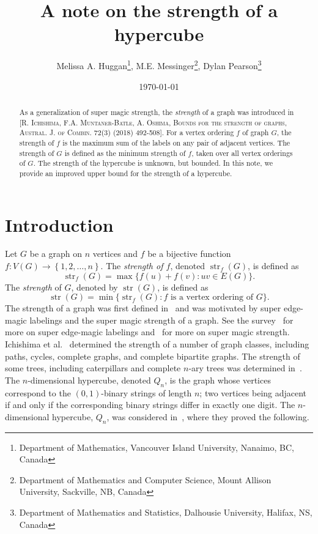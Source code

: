 \documentclass[12pt]{article}
\title{A note on the strength of a hypercube}
\author{Melissa A. Huggan\thanks{Department of Mathematics, Vancouver Island University, Nanaimo, BC, Canada}, M.E. Messinger\thanks{Department of Mathematics and Computer Science, Mount Allison University, Sackville, NB, Canada}, Dylan Pearson\thanks{Department of Mathematics and Statistics, Dalhousie University, Halifax, NS, Canada}}
\date{\today}
\DeclareMathOperator{\str}{str}
\begin{document}
\maketitle

\begin{abstract}  As a generalization of super magic strength, the \emph{strength} of a graph was introduced in [\textsc{R. Ichishima, F.A. Muntaner-Batle, A. Oshima, Bounds for the strength of graphs, Austral. J. of Combin. 72(3) (2018) 492-508}].  For a vertex ordering $f$ of graph $G$, the strength of $f$ is the maximum sum of the labels on any pair of adjacent vertices.  The strength of $G$ is defined as the minimum strength of $f$, taken over all vertex orderings of $G$.  The strength of the hypercube is unknown, but bounded. In this note, we provide an improved upper bound for the strength of a hypercube.
\end{abstract}




\section{Introduction}

Let $G$ be a graph on $n$ vertices and $f$ be a bijective function $f: V(G) \to \left\{1,2, \ldots, n\right\}$. The \emph{strength of $f$}, denoted $\str_f(G)$, is defined as \begin{equation*}\str_f(G) = \max \{ f(u)+f(v) : uv \in E(G)\}.\end{equation*} The \emph{strength} of $G$, denoted by $\str(G)$, is defined as \begin{equation*}\str(G) = \min \{ \str_f(G) : f \text{~is a vertex ordering of~} G\}.\end{equation*}  The strength of a graph was first defined in~\cite{I.2018} and was motivated by super edge-magic labelings and the super magic strength of a graph.  See the survey~\cite{WallisEdge} for more on super edge-magic labelings and~\cite{Av,I.2018} for more on super magic strength.  Ichishima et al.\ \cite{I.2018} determined the strength of a number of graph classes, including paths, cycles, complete graphs, and complete bipartite graphs. The strength of some trees, including caterpillars and complete $n$-ary trees was determined in~\cite{Trees}. The $n$-dimensional hypercube, denoted $Q_n$, is the graph whose vertices correspond to the $(0,1)$-binary strings of length $n$; two vertices being adjacent if and only if the corresponding binary strings differ in exactly one digit.  The $n$-dimensional hypercube, $Q_n$, was considered in~\cite{I.2018}, where they proved the following.
\end{document}

